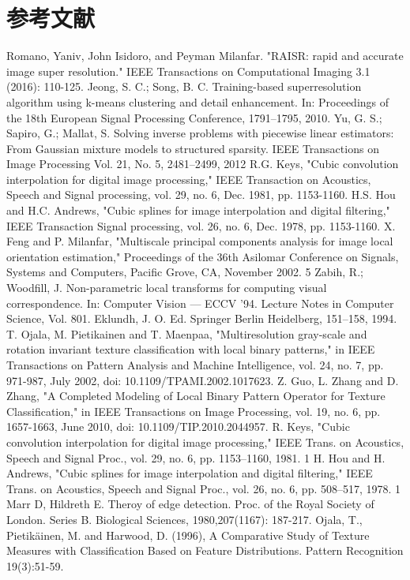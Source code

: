 \documentclass[12pt, a4paper, oneside]{ctexbook}
\begin{document}
	\chapter*{参考文献}
	\begin{thebibliography}{99}
		Romano, Yaniv, John Isidoro, and Peyman Milanfar. "RAISR: rapid and accurate image super resolution." IEEE Transactions on Computational Imaging 3.1 (2016): 110-125.
		Jeong, S. C.; Song, B. C. Training-based superresolution algorithm using k-means clustering and detail enhancement. In: Proceedings of the 18th European Signal Processing Conference, 1791–1795, 2010.
		 Yu, G. S.; Sapiro, G.; Mallat, S. Solving inverse problems with piecewise linear estimators: From Gaussian mixture models to structured sparsity. IEEE Transactions on Image Processing Vol. 21, No. 5, 2481–2499, 2012
		R.G. Keys, "Cubic convolution interpolation for digital image processing," IEEE Transaction on Acoustics, Speech and Signal processing, vol. 29, no. 6, Dec. 1981, pp. 1153-1160.
		H.S. Hou and H.C. Andrews, "Cubic splines for image interpolation and digital filtering," IEEE Transaction Signal processing, vol. 26, no. 6, Dec. 1978, pp. 1153-1160.
		X. Feng and P. Milanfar, "Multiscale principal components analysis for image local orientation estimation," Proceedings of the 36th Asilomar Conference on Signals, Systems and Computers, Pacific Grove, CA, November 2002. 5
		Zabih, R.; Woodfill, J. Non-parametric local transforms for computing visual correspondence. In: Computer Vision — ECCV '94. Lecture Notes in Computer Science, Vol. 801. Eklundh, J. O. Ed. Springer Berlin Heidelberg, 151–158, 1994.
		T. Ojala, M. Pietikainen and T. Maenpaa, "Multiresolution gray-scale and rotation invariant texture classification with local binary patterns," in IEEE Transactions on Pattern Analysis and Machine Intelligence, vol. 24, no. 7, pp. 971-987, July 2002, doi: 10.1109/TPAMI.2002.1017623.
		Z. Guo, L. Zhang and D. Zhang, "A Completed Modeling of Local Binary Pattern Operator for Texture Classification," in IEEE Transactions on Image Processing, vol. 19, no. 6, pp. 1657-1663, June 2010, doi: 10.1109/TIP.2010.2044957.
		 R. Keys, "Cubic convolution interpolation for digital image processing," IEEE Trans. on Acoustics, Speech and Signal Proc., vol. 29, no. 6, pp. 1153–1160, 1981. 1
		H. Hou and H. Andrews, "Cubic splines for image interpolation and digital filtering," IEEE Trans. on Acoustics, Speech and Signal Proc., vol. 26, no. 6, pp. 508–517, 1978. 1
		Marr D, Hildreth E. Theroy of edge detection. Proc. of the Royal Society of London. Series B. Biological Sciences, 1980,207(1167): 187-217.
		Ojala, T., Pietikäinen, M. and Harwood, D. (1996), A Comparative Study of Texture Measures with Classification Based on Feature Distributions. Pattern Recognition 19(3):51-59.
	\end{thebibliography}
\end{document}
